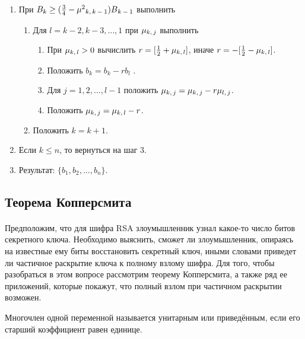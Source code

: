 \begin{enumerate}
     \item При {$ B_k \ge (\frac{3}{4} - \mu^2\textsubscript{{$k,k-1$}})B\textsubscript{{$k-1$}} $} выполнить
     
      \begin{enumerate}
       \item Для {$l=k-2,k-3,\dots,1$} при {$\mu\textsubscript{{$k,j$}}$} выполнить
       
	\begin{enumerate}
	  \item При {$ \mu\textsubscript{{$k,l$}} > 0 $} вычислить {$r=[\frac{1}{2} + \mu\textsubscript{{$k,l$}}]$}, иначе {$r=-[\frac{1}{2} - \mu\textsubscript{{$k,l$}}]$}.
	  \item Положить {$b_k=b_k - r b_l$}   .
	  \item Для {$j = 1, 2, \dots, l - 1$} положить {$\mu\textsubscript{{$k,j$}} = \mu\textsubscript{{$k,j$}} - r \mu\textsubscript{{$l,j$}}$}.
	  \item Положить {$\mu\textsubscript{{$k,j$}} = \mu\textsubscript{{$k,l$}} - r$}.
	\end{enumerate}
       
       \item  Положить {$k=k+1$}.   
      \end{enumerate}
     
     \item Если {$k \le n$}, то вернуться на шаг 3.
     \item Результат: {$\{ b_1,b_2, \dots, b_n \}$}.
    \end{enumerate}


\subsection{Теорема Копперсмита}
  \paragraph{} Предположим, что для шифра RSA злоумышленник узнал какое-то число битов секретного ключа. Необходимо выяснить, сможет ли злоумышленник, опираясь на известные ему биты восстановить секретный ключ, иными словами приведет ли частичное раскрытие ключа к полному взлому шифра. Для того, чтобы разобраться в этом вопросе рассмотрим теорему Копперсмита, а также ряд ее приложений, которые покажут, что полный взлом при частичном раскрытии возможен.

  \begin{definition}
    Многочлен одной переменной называется унитарным или приведённым, если его старший коэффициент равен единице.
  \end{definition}

